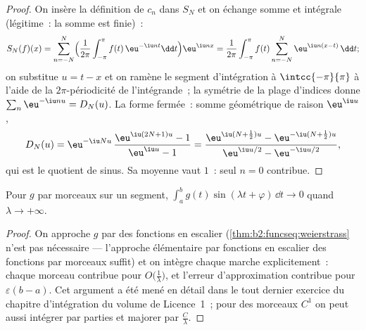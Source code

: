 \begin{proof}
On insère la définition de $c_n$ dans $S_N$ et on échange somme et
intégrale (légitime~: la somme est finie)~:
\[
S_N(f)(x)
= \sum_{n=-N}^{N}\Bigl(\frac{1}{2\pi}\int_{-\pi}^{\pi}
f(t)\,\eu^{-\iu nt}\dd t\Bigr)\eu^{\iu nx}
= \frac{1}{2\pi}\int_{-\pi}^{\pi} f(t)
\sum_{n=-N}^{N}\eu^{\iu n(x-t)}\,\dd t ;
\]
on substitue $u = t - x$ et on ramène le segment d'intégration à
$\intcc{-\pi}{\pi}$ à l'aide de la $2\pi$-périodicité de l'intégrande~;
la symétrie de la plage d'indices donne $\sum_n\eu^{-\iu nu} =
D_N(u)$. La forme fermée~: somme géométrique de raison $\eu^{\iu u}$,
\[
D_N(u) = \eu^{-\iu Nu}\,\frac{\eu^{\iu(2N+1)u} - 1}{\eu^{\iu u} -
1}
= \frac{\eu^{\iu(N + \frac12)u} - \eu^{-\iu(N+\frac12)u}}
{\eu^{\iu u/2} - \eu^{-\iu u/2}} ,
\]
qui est le quotient de sinus. Sa moyenne vaut $1$~: seul $n = 0$
contribue.
\end{proof}

\begin{theorem}\label{thm:b2:fourier:riemannlebesgue}
Pour $g$  par morceaux sur un segment,
$\int_a^b g(t)\sin(\lambda t + \varphi)\,\dd t \to 0$ quand $\lambda
\to +\infty$.
\end{theorem}

\begin{proof}
On approche $g$  par des fonctions en escalier
(\cref{thm:b2:funcseq:weierstrass} n'est pas nécessaire --- l'approche
élémentaire par fonctions en escalier des fonctions  par
morceaux suffit) et on intègre chaque marche explicitement~: chaque
morceau contribue pour $O\bigl(\frac1\lambda\bigr)$, et l'erreur
d'approximation contribue pour $\varepsilon(b - a)$. Cet argument a
été mené en détail dans le tout dernier exercice du chapitre
d'intégration du volume de Licence~1~; pour des morceaux $C^1$ on peut
aussi intégrer par parties et majorer par $\frac C\lambda$.
\end{proof}

